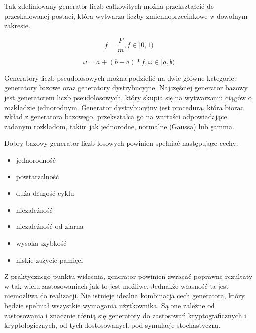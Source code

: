 Tak zdefiniowany generator liczb całkowitych można przekształcić do przeskalowanej postaci, która wytwarza liczby zmiennoprzecinkowe w dowolnym zakresie.

\[f = \frac{P}{m}, f \in [0, 1)\]

\[\omega = a + (b - a) * f, \omega \in [a,b)\]

Generatory liczb pseudolosowych można podzielić na dwie główne kategorie: generatory bazowe oraz generatory dystrybucyjne.
Najczęściej generator bazowy jest generatorem liczb pseudolosowych, który skupia się na wytwarzaniu ciągów o rozkładzie jednorodnym. Generator dystrybucyjny jest procedurą, która biorąc wkład z generatora bazowego, przekształca go na wartości odpowiadające zadanym rozkładom, takim jak jednorodne, normalne (Gaussa) lub gamma.

Dobry bazowy generator liczb losowych powinien spełniać następujące cechy:

\begin{itemize}
\tightlist
\item
  jednorodność
\item
  powtarzalność
\item
  duża długość cyklu
\item
  niezależność
\item
  niezależność od ziarna
\item
  wysoka szybkość
\item
  niskie zużycie pamięci
\end{itemize}

Z praktycznego punktu widzenia, generator powinien zwracać poprawne rezultaty w tak wielu zastosowaniach jak to jest możliwe. Jednakże własność ta jest niemożliwa do realizacji.
Nie istnieje idealna kombinacja cech generatora, który będzie spełniał wszystkie wymagania użytkownika. Są one zależne od zastosowania i znacznie różnią się generatory do zastosowań kryptograficznych i kryptologicznych, od tych dostosowanych pod symulacje stochastyczną.

